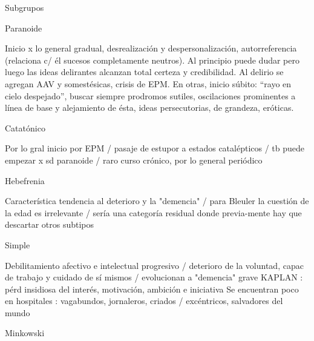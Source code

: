 \documentclass{scrbook}
\begin{document}
Subgrupos

Paranoide

Inicio x lo general gradual, desrealización y despersonalización, autorreferencia (relaciona c/ él sucesos completamente neutros). Al principio puede dudar pero luego las ideas delirantes alcanzan total certeza y credibilidad. Al delirio se agregan AAV y somestésicas, crisis de EPM. En otras, inicio súbito: “rayo en cielo despejado”, buscar siempre prodromos sutiles, oscilaciones prominentes a línea de base y alejamiento de ésta, ideas persecutorias, de grandeza, eróticas.

Catatónico

Por lo gral inicio por EPM / pasaje de estupor a estados catalépticos / tb puede empezar x sd paranoide / raro curso crónico, por lo general periódico

Hebefrenia

Característica tendencia al deterioro y la "demencia" / para Bleuler la cuestión de la edad es irrelevante / sería una categoría residual donde previa-mente hay que descartar otros subtipos

Simple

Debilitamiento afectivo e intelectual progresivo / deterioro de la voluntad, capac de trabajo y cuidado de sí mismos / evolucionan a "demencia" grave KAPLAN : pérd insidiosa del interés, motivación, ambición e iniciativa Se encuentran poco en hospitales : vagabundos, jornaleros, criados / excéntricos, salvadores del mundo

Minkowski
\end{document}

